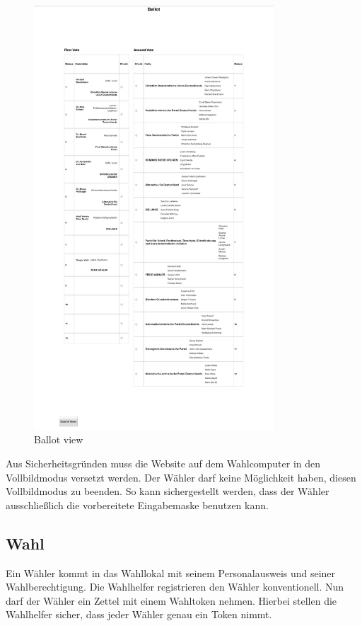 \documentclass[a4paper]{scrreprt}
\begin{document}
\begin{figure}[H]
\centering
\includegraphics[width=0.8\textwidth]{images/ballot.png}
\caption {Ballot view}
\end{figure}

Aus Sicherheitsgründen muss die Website auf dem Wahlcomputer in den Vollbildmodus versetzt werden. Der Wähler darf keine Möglichkeit haben, diesen Vollbildmodus zu beenden. So kann sichergestellt werden, dass der Wähler ausschließlich die vorbereitete Eingabemaske benutzen kann.

\subsection{Wahl}

Ein Wähler kommt in das Wahllokal mit seinem Personalausweis und seiner Wahlberechtigung.
Die Wahlhelfer registrieren den Wähler konventionell.
Nun darf der Wähler ein Zettel mit einem Wahltoken nehmen.
Hierbei stellen die Wahlhelfer sicher, dass jeder Wähler genau ein Token nimmt.
\end{document}
